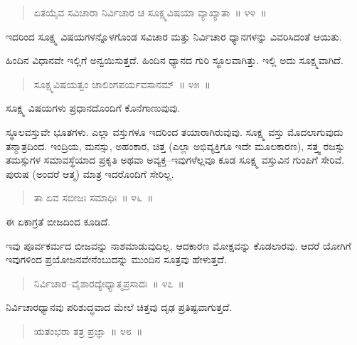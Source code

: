 \vspace{-0.3cm}

\begin{verse}
ಏತಯೈವ ಸವಿಚಾರಾ ನಿರ್ವಿಚಾರ ಚ ಸೂಕ್ಷ್ಮವಿಷಯಾ ವ್ಯಾಖ್ಯಾತಾ~॥ ೪೪~॥
\end{verse}

\vspace{-0.3cm}

ಇದರಿಂದ ಸೂಕ್ಷ್ಮ ವಿಷಯಗಳನ್ನೊಳಗೊಂಡ ಸವಿಚಾರ ಮತ್ತು ನಿರ್ವಿಚಾರ ಧ್ಯಾನಗಳನ್ನು ವಿವರಿಸಿದಂತೆ ಆಯಿತು. 

ಹಿಂದಿನ ವಿಧಾನವೇ ಇಲ್ಲಿಗೆ ಅನ್ವಯಿಸುತ್ತದೆ. ಹಿಂದಿನ ಧ್ಯಾನದ ಗುರಿ ಸ್ಥೂಲವಾಗಿತ್ತು. ಇಲ್ಲಿ ಅದು ಸೂಕ್ಷ್ಮವಾಗಿದೆ. 

\vspace{-0.3cm}

\begin{verse}
ಸೂಕ್ಷ್ಮವಿಷಯತ್ವಂ ಚಾಲಿಂಗಪರ್ಯವಸಾನಮ್​~॥ ೪೫~॥
\end{verse}

\vspace{-0.3cm}

ಸೂಕ್ಷ್ಮ ವಿಷಯಗಳು ಪ್ರಧಾನದೊಂದಿಗೆ ಕೊನೆಗಾಣುವುವು. 

ಸ್ಥೂಲವಸ್ತುವೇ ಭೂತಗಳು. ಎಲ್ಲಾ ವಸ್ತುಗಳೂ ಇದರಿಂದ ತಯಾರಾಗಿರುವುವು. ಸೂಕ್ಷ್ಮ ವಸ್ತು ಮೊದಲಾಗುವುದು ತನ್ಮಾತ್ರದಿಂದ. ಇಂದ್ರಿಯ, ಮನಸ್ಸು, ಅಹಂಕಾರ, ಚಿತ್ತ (ಎಲ್ಲಾ ಅಭಿವ್ಯಕ್ತಿಗೂ ಇದೇ ಮೂಲಕಾರಣ), ಸತ್ತ್ವ ರಜಸ್ಸು ತಮಸ್ಸುಗಳ ಸಮಾವಸ್ಥೆಯಾದ ಪ್ರಕೃತಿ ಅಥವಾ ಅವ್ಯಕ್ತ–ಇವುಗಳೆಲ್ಲವೂ ಕೂಡ ಸೂಕ್ಷ್ಮ ವಸ್ತುವಿನ ಗುಂಪಿಗೆ ಸೇರಿವೆ. ಪುರುಷ (ಅಂದರೆ ಆತ್ಮ) ಮಾತ್ರ ಇದರೊಂದಿಗೆ ಸೇರಿಲ್ಲ.

\begin{verse}
ತಾ ಏವ ಸಬೀಜಃ ಸಮಾಧಿಃ~॥ ೪೬~॥
\end{verse}

\vspace{-0.3cm}

ಈ ಏಕಾಗ್ರತೆ ಬೀಜದಿಂದ ಕೂಡಿದೆ. 

ಇವು ಪೂರ್ವಕರ್ಮದ ಬೀಜವನ್ನು ನಾಶಮಾಡುವುದಿಲ್ಲ. ಆದಕಾರಣ ಮೋಕ್ಷವನ್ನು ಕೊಡಲಾರವು. ಆದರೆ ಯೋಗಿಗೆ ಇವುಗಳಿಂದ ಪ್ರಯೋಜನವೇನೆಂಬುದನ್ನು ಮುಂದಿನ ಸೂತ್ರವು ಹೇಳುತ್ತದೆ. 

\vspace{-0.3cm}

\begin{verse}
ನಿರ್ವಿಚಾರ–ವೈಶಾರದ್ಯೇಧ್ಯಾತ್ಮಪ್ರಸಾದಃ~॥ ೪೭~॥
\end{verse}

\vspace{-0.3cm}

ನಿರ್ವಿಚಾರಧ್ಯಾನವು ಪರಿಶುದ್ಧವಾದ ಮೇಲೆ ಚಿತ್ತವು ದೃಢ ಪ್ರತಿಷ್ಟವಾಗುತ್ತದೆ. 

\vspace{-0.3cm}

\begin{verse}
ಋತಂಭರಾ ತತ್ರ ಪ್ರಜ್ಞಾ~॥ ೪೮~॥
\end{verse}

